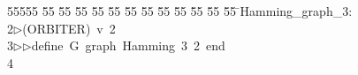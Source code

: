 %
%
\begin{tabbing}
55555 \= 55 \= 55 \= 55 \= 55 \= 55 \= 55 \= 55 \= 55 \= 55 \= 55 \= 55 \= 55 \= \>Hamming\_graph\_3:\\[0pt]
2\>$\triangleright$\>(ORBITER)\ v\ 2\ \\[0pt]
3\>$\triangleright$\>$\triangleright$\>define\ G\ graph\ Hamming\ 3\ 2\ end\\[0pt]
4\>\end{tabbing}
